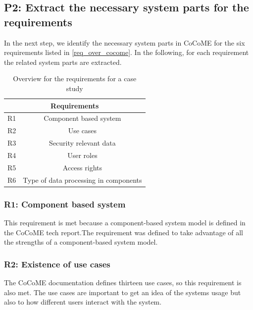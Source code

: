 \subsection{P2: Extract the necessary system parts for the requirements}
\label{reqCoCoME}
In the next step, we identify the necessary system parts in CoCoME for the six requirements listed in \autoref{req_over_cocome}. In the following, for each requirement the related system parts are extracted. 
\begin{table}
\begin{tabular}{|c|c|}
\hline 
\multicolumn{2}{|c|}{Requirements} \\ 
\hline 
R1 & Component based system \\ 
\hline 
R2 & Use cases \\ 
\hline 
R3 & Security relevant data \\ 
\hline 
R4 & User roles \\ 
\hline 
R5 & Access rights \\ 
\hline 
R6 & Type of data processing in components \\ 
\hline 
\end{tabular} 
\caption{Overview for the requirements for a case study}
\label{req_over_cocome}
\end{table}

\subsubsection{R1: Component based system}
This requirement is met because a component-based system model is defined in the CoCoME tech report.The requirement was defined to take advantage of all the strengths of a component-based system model. 
\subsubsection{R2: Existence of use cases}
\label{req_uc}
The CoCoME documentation defines thirteen use cases, so this requirement is also met. The use cases are important to get an idea of the systems usage but also to how different users interact with the system. 
